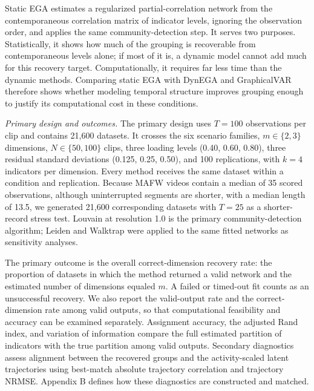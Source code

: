 \documentclass[
]{article}
\begin{document}
Static EGA estimates a regularized partial-correlation network from the
contemporaneous correlation matrix of indicator levels, ignoring the
observation order, and applies the same community-detection step. It
serves two purposes. Statistically, it shows how much of the grouping is
recoverable from contemporaneous levels alone; if most of it is, a
dynamic model cannot add much for this recovery target. Computationally,
it requires far less time than the dynamic methods. Comparing static EGA
with DynEGA and GraphicalVAR therefore shows whether modeling temporal
structure improves grouping enough to justify its computational cost in
these conditions.

\emph{Primary design and outcomes.} The primary design uses \(T=100\)
observations per clip and contains 21,600 datasets. It crosses the six
scenario families, \(m\in\{2,3\}\) dimensions, \(N\in\{50,100\}\) clips,
three loading levels (0.40, 0.60, 0.80), three residual standard
deviations (0.125, 0.25, 0.50), and 100 replications, with \(k=4\)
indicators per dimension. Every method receives the same dataset within
a condition and replication. Because MAFW videos contain a median of 35
scored observations, although uninterrupted segments are shorter, with a
median length of 13.5, we generated 21,600 corresponding datasets with
\(T=25\) as a shorter-record stress test. Louvain at resolution 1.0 is
the primary community-detection algorithm; Leiden and Walktrap were
applied to the same fitted networks as sensitivity analyses.

The primary outcome is the overall correct-dimension recovery rate: the
proportion of datasets in which the method returned a valid network and
the estimated number of dimensions equaled \(m\). A failed or timed-out
fit counts as an unsuccessful recovery. We also report the valid-output
rate and the correct-dimension rate among valid outputs, so that
computational feasibility and accuracy can be examined separately.
Assignment accuracy, the adjusted Rand index, and variation of
information compare the full estimated partition of indicators with the
true partition among valid outputs. Secondary diagnostics assess
alignment between the recovered groups and the activity-scaled latent
trajectories using best-match absolute trajectory correlation and
trajectory NRMSE. Appendix B defines how these diagnostics are
constructed and matched.
\end{document}
